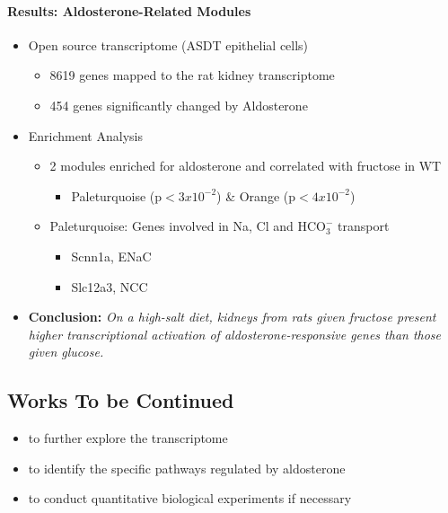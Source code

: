 \documentclass[
11pt,notheorems,hyperref={pdfauthor=whatever}
]{beamer}
\begin{document}
\begin{frame}
    \framesubtitle{Results: Aldosterone-Related Modules}
    \begin{itemize}
        \item Open source transcriptome (ASDT epithelial cells) \cite{poulsen2018rna}
        \begin{itemize}
            \item 8619 genes mapped to the rat kidney transcriptome
            \item 454 genes significantly changed by Aldosterone
        \end{itemize}
        \item Enrichment Analysis
        \begin{itemize}
            \item 2 modules enriched for aldosterone and correlated with fructose in WT
            \begin{itemize}
                \item Paleturquoise ($\text{p}<3x10^{-2}$) \& Orange ($\text{p}<4x10^{-2}$)
            \end{itemize}
            \item Paleturquoise: Genes involved in Na, Cl and $\text{HCO}_{3}^{-}$ transport
            \begin{itemize}
                \item Scnn1a, ENaC
                \item Slc12a3, NCC
            \end{itemize}
        \end{itemize}
        \item \textbf{Conclusion:} \textit{On a high-salt diet, kidneys from rats given fructose present higher transcriptional activation of aldosterone-responsive genes than those given glucose.}
    \end{itemize}
\end{frame}

\subsection{Works To be Continued}
\begin{frame}
    \begin{itemize}
        \item to further explore the transcriptome
        \item to identify the specific pathways regulated by aldosterone
        \item to conduct quantitative biological experiments if necessary
    \end{itemize}
\end{frame}
\end{document}
